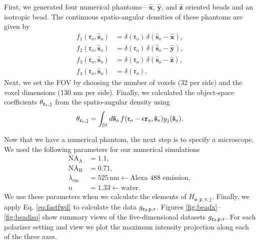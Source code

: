 \documentclass[11pt]{article}
\providecommand{\ro}{\mathbf{\mathfrak{r}}_o}
\providecommand{\so}{\mathbf{\hat{s}}_o}
\providecommand{\mh}[1]{\mathbf{\hat{#1}}}
\providecommand{\mbb}[1]{\mathbb{#1}}
\providecommand{\bs}[1]{\boldsymbol{#1}}
\providecommand{\tb}[1]{\textbf{#1}}
\providecommand{\ttt}[1]{\texttt{#1}}
\providecommand{\ints}[1]{\int_{\mbb{S}^{#1}}}
\begin{document}
First, we generated four numerical phantoms---$\mh{x}$, $\mh{y}$, and $\mh{z}$
oriented beads and an isotropic bead. The continuous spatio-angular densities of
these phantoms are given by
\begin{align}
  f_1(\ro, \so) &= \delta(\ro)\, \delta(\so - \mh{x}), \\
  f_2(\ro, \so) &= \delta(\ro)\, \delta(\so - \mh{y}), \\
  f_3(\ro, \so) &= \delta(\ro)\, \delta(\so - \mh{z}), \\
  f_4(\ro, \so) &= \delta(\ro).
\end{align}
Next, we set the FOV by choosing the number of voxels (32 per side) and the
voxel dimensions (130 nm per side). Finally, we calculated the object-space
coefficients $\theta_{\ttt{\tb{r}}_{\ttt{o}},\ttt{j}}$ from the spatio-angular
density using
\begin{align}
  \theta_{\ttt{\tb{r}}_{\ttt{o}},\ttt{j}} = \ints{2}d\so\, f(\ro - \epsilon\ttt{\tb{r}}_{\ttt{o}},\so)y_{\ttt{j}}(\so). \label{eq:spang2co}
\end{align}

Now that we have a numerical phantom, the next step is to specify a microscope.
We used the following parameters for our numerical simulations
\begin{align}
  \text{NA}_{\text{A}} &= 1.1,\\
  \text{NA}_{\text{B}} &= 0.71,\\
  \lambda_{\text{em}} &= 525\, \text{nm} \leftarrow \text{Alexa 488 emission},\\
  n &= 1.33 \leftarrow \text{water}.
\end{align}
We use these parameters when we calculate the elements of
$H_{\bar{\bs{\nu}},\ttt{p},\ttt{v},\ttt{j}}$. Finally, we apply Eq.
\ref{eq:fastfwd} to calculate the data
$g_{\tb{\ttt{r}}_{\ttt{d}},\ttt{p},\ttt{v}}$. Figures
\ref{fig:beadx}--\ref{fig:beadiso} show summary views of the five-dimensional
datasets $g_{\tb{\ttt{r}}_{\ttt{d}},\ttt{p},\ttt{v}}$. For each polarizer
setting and view we plot the maximum intensity projection along each of the
three axes.
\end{document}
